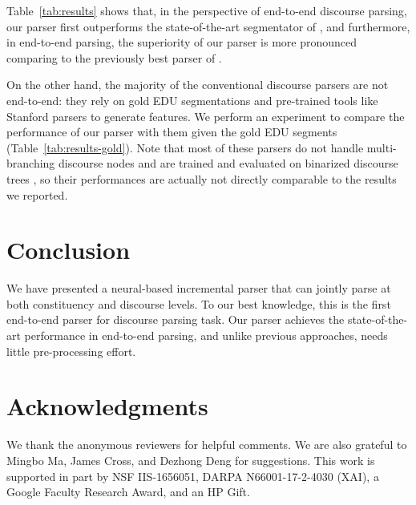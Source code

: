 \documentclass[11pt,letterpaper]{article}
\begin{document}
Table~\ref{tab:results} shows that, 
in the perspective of end-to-end discourse parsing,
our parser first outperforms the state-of-the-art segmentator
of ,
and furthermore, in end-to-end parsing, the superiority
of our parser is more pronounced comparing to
the previously best parser of .

On the other hand, the majority of the conventional discourse parsers are not end-to-end:
they rely on gold EDU segmentations and pre-trained tools like Stanford parsers to generate features.
We perform an experiment to compare the performance of our parser
with them given the gold EDU segments (Table~\ref{tab:results-gold}).
Note that most of these parsers do not handle multi-branching discourse nodes and are trained and evaluated
on binarized discourse trees \cite{feng2014linear,li2014recursive,li2014text,ji2014representation,heilman2015fast}, so their performances are actually not directly comparable to
the results we reported.


\iffalse
We also noticed that for neural models, some sparse features,
like lengths of EDUs, distances between EDUs, and whether two EDUs are in the same sentence,
can significantly improve the parsing performance in nuclearity and relation,
and they are difficult for the neural models to extract \cite{li2014recursive,ji2014representation}.
\fi
 
\section{Conclusion}
We have presented a neural-based incremental parser that can jointly parse
at both constituency and discourse levels.
To our best knowledge, this is the first end-to-end parser for discourse parsing task.
Our parser achieves the state-of-the-art performance in end-to-end parsing,
and unlike previous approaches, needs little pre-processing effort.

\section*{Acknowledgments}
{\small
We thank the anonymous reviewers for helpful comments.
We are also grateful to Mingbo Ma, James Cross, and Dezhong Deng for suggestions.
This work is supported in part by
NSF IIS-1656051,
DARPA N66001-17-2-4030 (XAI),
a Google Faculty Research Award,
and an HP Gift.
}


\end{document}

